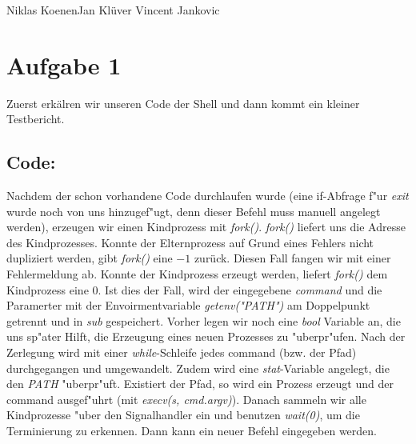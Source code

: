 \documentclass{ti2}
\newcommand{\mm}{\emph}
\begin{document}
%
                {Niklas Koenen}{Jan Klüver}%
                {Vincent Jankovic}{}%

\section*{Aufgabe 1} Zuerst erkälren wir unseren Code der Shell und dann kommt ein kleiner Testbericht.
\subsection*{Code:}
Nachdem der schon vorhandene Code durchlaufen wurde (eine if-Abfrage f"ur \mm{exit} wurde noch von uns hinzugef"ugt, denn dieser Befehl muss manuell angelegt werden), erzeugen wir einen Kindprozess mit \emph{fork()}. \emph{fork()} liefert uns die Adresse des Kindprozesses. Konnte der Elternprozess  auf Grund eines Fehlers nicht dupliziert werden, gibt \emph{fork()} eine $-1$ zurück. Diesen Fall fangen wir mit einer Fehlermeldung ab. Konnte der Kindprozess erzeugt werden, liefert \mm{fork()} dem Kindprozess eine 0. Ist dies der Fall, wird der eingegebene \mm{command} und die Paramerter mit der Envoirmentvariable \mm{getenv("PATH")} am Doppelpunkt getrennt und in \mm{sub} gespeichert. Vorher legen wir noch eine \mm{bool} Variable an, die uns sp"ater Hilft, die Erzeugung eines neuen Prozesses zu "uberpr"ufen. Nach der Zerlegung wird mit einer \mm{while}-Schleife jedes command (bzw. der Pfad) durchgegangen und umgewandelt. Zudem wird eine \mm{stat}-Variable angelegt, die den \mm{PATH} "uberpr"uft. Existiert der Pfad, so wird ein Prozess erzeugt und der command ausgef"uhrt (mit \mm{execv(s, cmd.argv)}). Danach sammeln wir alle Kindprozesse "uber den Signalhandler ein und benutzen \mm{wait(0)}, um die Terminierung zu erkennen. Dann kann ein neuer Befehl eingegeben werden.
\end{document}
